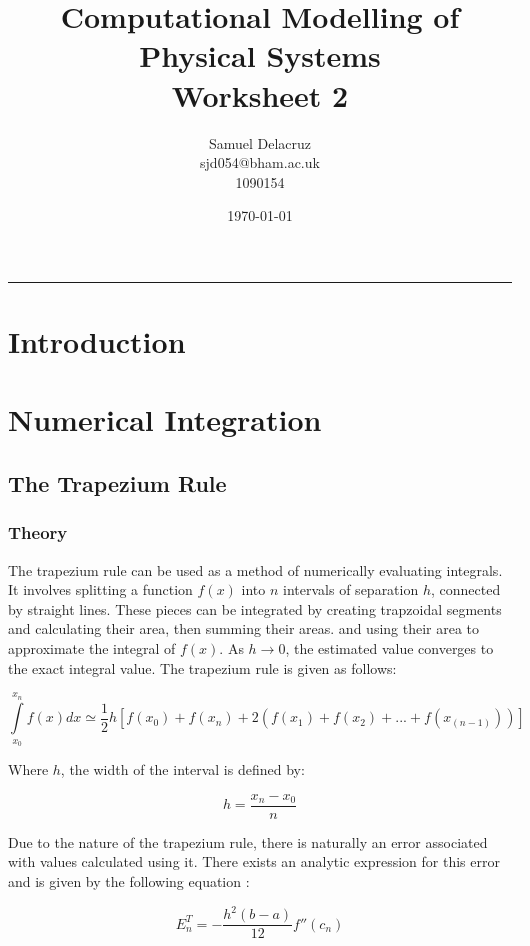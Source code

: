 \documentclass[pdf,color]{UoBnote}
\author{Samuel Delacruz\\
				sjd054@bham.ac.uk\\
				1090154}
\title{Computational Modelling of Physical Systems\\Worksheet 2}
\date{\today}
\begin{document}
\maketitle
\tableofcontents
\vspace{1cm}\hrule \vspace{1cm}

\section{Introduction}
\section{Numerical Integration}
	\subsection{The Trapezium Rule}
		\subsubsection{Theory}
			The trapezium rule can be used as a method of numerically evaluating integrals. It involves splitting a function $f(x)$ into $n$ intervals of separation $h$,
			connected by straight lines. These pieces can be integrated by creating trapzoidal segments and calculating their area, then summing their areas.
			and using their area to approximate the integral of $f(x)$. As $h \rightarrow 0$, the estimated value converges to the exact integral value. The trapezium rule is given as follows:
			
			\begin{equation} \label{eq:trapezium}
				\int\limits_{x_0}^{x_n} f(x) dx \simeq \frac{1}{2}h\left[f(x_0) + f(x_n) + 2(f(x_1) + f(x_2) +...+ f(x_(n-1)))\right]
			\end{equation}
			
			Where $h$, the width of the interval is defined by:
			
			\begin{equation} \label{eq:h_def}
				h = \frac{x_n - x_0}{n}
			\end{equation}
			
			Due to the nature of the trapezium rule, there is naturally an error associated with values calculated using it.
			There exists an analytic expression for this error and is given by the following equation \cite{errors_web}:
			
			
			\begin{equation} \label{eq:trap_err}
				E_n^T = -\frac{h^2\left(b-a\right)}{12}f''(c_n)
			\end{equation}
			
\end{document}
